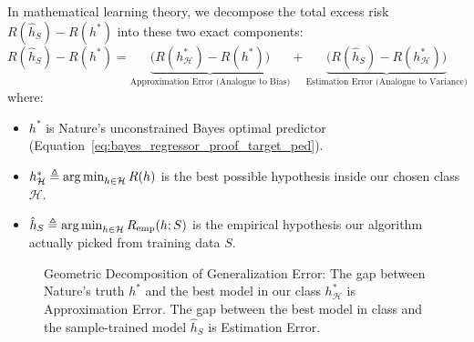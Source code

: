In mathematical learning theory, we decompose the total excess risk $R(\hat{h}_S) - R(h^*)$ into these two exact components:
\begin{equation}
R(\hat{h}_S) - R(h^*) = \underbrace{\big( R(h^*_{\mathcal{H}}) - R(h^*) \big)}_{\text{Approximation Error (Analogue to Bias)}} + \underbrace{\big( R(\hat{h}_S) - R(h^*_{\mathcal{H}}) \big)}_{\text{Estimation Error (Analogue to Variance)}}
\label{eq:approx_estimation_decomp_ped}
\end{equation}
where:
\begin{itemize}
    \item $h^*$ is Nature's unconstrained Bayes optimal predictor (Equation~\eqref{eq:bayes_regressor_proof_target_ped}).
    \item $h^*_{\mathcal{H}} \triangleq \operatorname*{arg\,min}_{h \in \mathcal{H}} R(h)$ is the best possible hypothesis inside our chosen class $\mathcal{H}$.
    \item $\hat{h}_S \triangleq \operatorname*{arg\,min}_{h \in \mathcal{H}} R_{\text{emp}}(h; S)$ is the empirical hypothesis our algorithm actually picked from training data $S$.
\end{itemize}

\begin{figure}[htbp]
\centering
{}
\caption{Geometric Decomposition of Generalization Error: The gap between Nature's truth $h^*$ and the best model in our class $h^*_{\mathcal{H}}$ is Approximation Error. The gap between the best model in class and the sample-trained model $\hat{h}_S$ is Estimation Error.}
\label{fig:approx_est_geometry_ped}
\end{figure}

